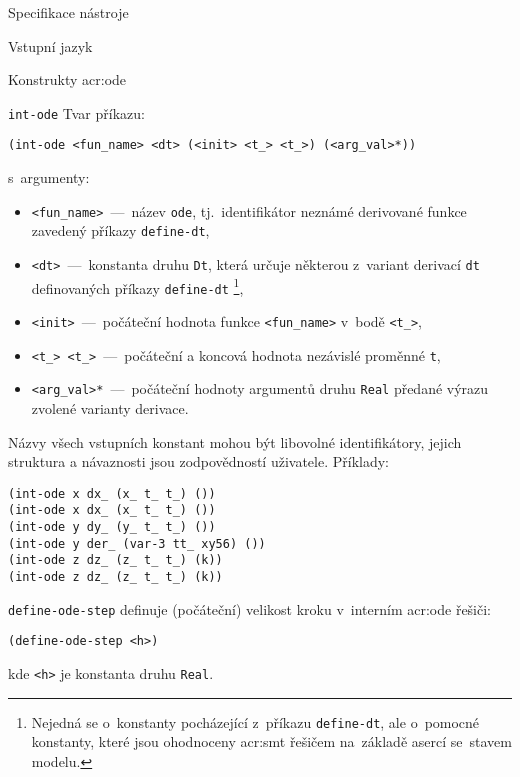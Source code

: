 \documentclass[thesis=M,czech]{FITthesis}[2012/06/26]
\newcommand{\acrlabel}[1]{acr:#1}
\newcommand{\acr}[1]{\acrshort{\acrlabel{#1}}}
\newcommand{\id}[1]{\texttt{#1}}
\begin{document}
\begin{section}{Specifikace nástroje}
\begin{subsection}{Vstupní jazyk}
\begin{subsubsection}{Konstrukty \acr{ode}}
\begin{paragraph}{\id{int-ode}}
Tvar příkazu:
\begin{center}
\id{(int-ode <fun\_\-name> <dt> (<init> <t\_> <t\_>) (<arg\_\-val>*))}
\end{center}
s~argumenty:
\begin{itemize}
\item \id{<fun\_\-name>}~---~název \id{ode},
   tj.~identifikátor neznámé derivované funkce
   zavedený příkazy \id{define\--dt},
\item \id{<dt>}~---~konstanta druhu \id{Dt}, která určuje
   některou z~variant derivací \id{dt} definovaných příkazy \id{define\--dt}%
   \footnote{Nejedná se o~konstanty pocházející z~příkazu \id{define\--dt},
   ale o~pomocné konstanty, které jsou ohodnoceny \acr{smt} řešičem
   na~základě asercí se~stavem modelu.},
\item \id{<init>}~---~počáteční hodnota funkce \id{<fun\_\-name>}
   v~bodě \id{<t\_>},
\item \id{<t\_\-1> <t\_>}~---~počáteční a koncová hodnota
   nezávislé proměnné \id{t},
\item \id{<arg\_\-val>*}~---~počáteční hodnoty argumentů druhu \id{Real}
   předané výrazu zvolené varianty derivace.
\end{itemize}
Názvy všech vstupních konstant mohou být libovolné identifikátory,
jejich struktura a návaznosti jsou zodpovědností uživatele.
Příklady:
\begin{center}
\id{(int-ode x dx\_ (x\_\-0 t\_\-0 t\_) ())} \\
\id{(int-ode x dx\_\-1 (x\_\-1 t\_ t\_) ())} \\
\id{(int-ode y dy\_\-1 (y\_\-1 t\_\-1 t\_\-2) ())} \\
\id{(int-ode y der\_ (var-3 tt\_ xy56) ())} \\
\id{(int-ode z dz\_ (z\_\-1 t\_ t\_) (k))} \\
\id{(int-ode z dz\_\-2 (z\_\-1 t\_\-1 t\_) (k))}
\end{center}
\end{paragraph} %


\begin{paragraph}{\id{define-ode-step}}\label{p:design:spec:ilang:ode:step}
definuje (počáteční) velikost kroku
v~interním \acr{ode} řešiči:
\begin{center}
\id{(define-ode-step <h>)}
\end{center}
kde \id{<h>} je konstanta druhu \id{Real}.
\end{paragraph} %


\end{subsubsection}
\end{subsection}
\end{section}
\end{document}
